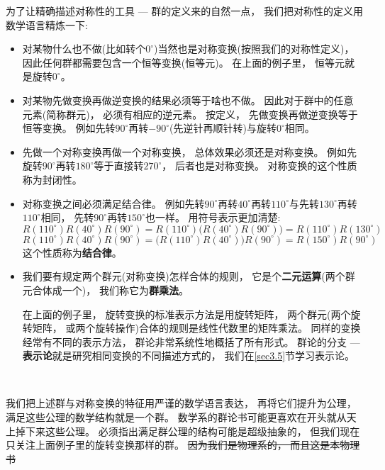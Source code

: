 为了让精确描述对称性的工具 --- 群的定义来的自然一点， 我们把对称性的定义用数学语言精炼一下:
\begin{itemize}
	\item 对某物什么也不做(比如转个$0^\circ$)当然也是对称变换(按照我们的对称性定义)， 因此任何群都需要包含一个恒等变换(恒等元)。 在上面的例子里， 恒等元就是旋转$0^\circ$。
	
	\item 对某物先做变换再做逆变换的结果必须等于啥也不做。 因此对于群中的任意元素(简称群元)， 必须有相应的逆元素。 按定义， 先做变换再做逆变换等于恒等变换。 例如先转$90^\circ$再转$-90^\circ$(先逆针再顺针转)与旋转$0^\circ$相同。
	
	\item 先做一个对称变换再做一个对称变换， 总体效果必须还是对称变换。 例如先旋转$90^\circ$再转$180^\circ$等于直接转$270^\circ$， 后者也是对称变换。 对称变换的这个性质称为封闭性。
	
	\item 对称变换之间必须满足结合律。 例如先转$90^\circ$再转$40^\circ$再转$110^\circ$与先转$130^\circ$再转$110^\circ$相同， 先转$90^\circ$再转$150^\circ$也一样。 用符号表示更加清楚:
	\begin{equation}\label{equ3.1}
	R(110^\circ) R(40^\circ) R(90^\circ) = R(110^\circ)\bigg( R(40^\circ)R(90^\circ) \bigg) = R(110^\circ) R(130^\circ)
	\end{equation}
	\begin{equation}\label{equ3.2}
	R(110^\circ) R(40^\circ) R(90^\circ) = \bigg( R(110^\circ) R(40^\circ) \bigg) R(90^\circ) = R(150^\circ) R(90^\circ)
	\end{equation}
	这个性质称为{\bf 结合律}。
	
	\item 我们要有规定两个群元(对称变换)怎样合体的规则， 它是个{\bf 二元运算}(两个群元合体成一个)， 我们称它为{\bf 群乘法}。 
	
	在上面的例子里， 旋转变换的标准表示方法是用旋转矩阵， 两个群元(两个旋转矩阵， 或两个旋转操作)合体的规则是线性代数里的矩阵乘法。 同样的变换经常有不同的表示方法， 群论非常系统性地概括了所有形式。 群论的分支 --- {\bf 表示论}就是研究相同变换的不同描述方式的， 我们在\ref{sec3.5}节学习表示论。
\end{itemize}

\ 

我们把上述群与对称变换的特征用严谨的数学语言表达， 再将它们提升为公理， 满足这些公理的数学结构就是一个群。 数学系的群论书可能更喜欢在开头就从天上掉下来这些公理。 必须指出满足群公理的结构可能是超级抽象的， 但我们现在只关注上面例子里的旋转变换那样的群。 \sout{因为我们是物理系的， 而且这是本物理书}

